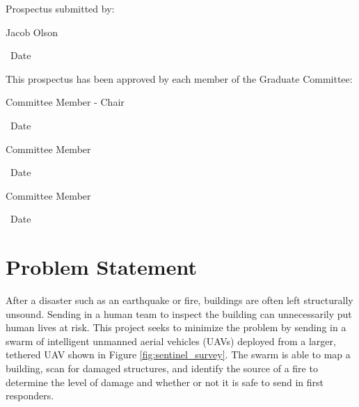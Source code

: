 \documentclass[12pt, letterpaper]{article}
\begin{document}
\hspace*{.47in}
\begin{minipage}[c]{5.25in}

\normalsize

Prospectus submitted by:

\vspace{.5in}

\makebox[2in]{\hrulefill} \hspace{1in} \makebox[2in]{\hrulefill}

\parbox[b]{3in}{Jacob Olson} \, Date
\vspace{0.5in}

This prospectus has been approved by each member of the Graduate Committee:
\vspace{0.5in}

\makebox[2in]{\hrulefill} \hspace{1in} \makebox[2in]{\hrulefill}

\parbox[b]{3in}{Committee Member - Chair} \, Date
\vspace{0.4in}

\makebox[2in]{\hrulefill} \hspace{1in} \makebox[2in]{\hrulefill}

\parbox[b]{3in}{Committee Member} \, Date
\vspace{0.4in}

\makebox[2in]{\hrulefill} \hspace{1in} \makebox[2in]{\hrulefill}

\parbox[b]{3in}{Committee Member} \, Date

\end{minipage}

\vspace*{\fill}

\pagebreak

\setcounter{page}{1}

\section{Problem Statement}
After a disaster such as an earthquake or fire, buildings are often left structurally unsound. Sending in a human team to inspect the building can unnecessarily put human lives at risk. This project seeks to minimize the problem by sending in a swarm of intelligent unmanned aerial vehicles (UAVs) deployed from a larger, tethered UAV shown in Figure \ref{fig:sentinel_survey}. The swarm is able to map a building, scan for damaged structures, and identify the source of a fire to determine the level of damage and whether or not it is safe to send in first responders.
\end{document}
